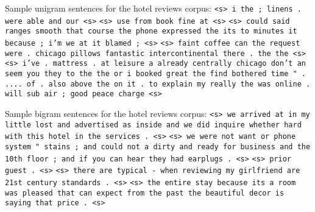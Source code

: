 \documentclass{article}
\begin{document}
Sample unigram sentences for the hotel reviews corpus:\npar
\texttt{<s> i the ; linens . were able and our <s>}\npar
\texttt{<s> use from book fine at <s>}\npar
\texttt{<s> could said ranges smooth that course the phone expressed the its to minutes it because ; i'm we at it blamed ; <s>}\npar
\texttt{<s> faint coffee can the request were . chicago pillows fantastic intercontinental there . the the <s>}\npar
\texttt{<s> i've . mattress . at leisure a already centrally chicago don't an seem you they to the the or i booked great the find bothered time " . .... of . also above the on it . to explain my really the was online . will sub air ; good peace charge <s>}\npar
\bigskip

Sample bigram sentences for the hotel reviews corpus:\npar
\texttt{<s> we arrived at in my little lost and advertised as inside and we did inquire whether hard with this hotel in the services . <s>}\npar
\texttt{<s> we were not want or phone system " stains ; and could not a dirty and ready for business and the 10th floor ; and if you can hear they had earplugs . <s>}\npar
\texttt{<s> prior guest . <s>}\npar
\texttt{<s> there are typical - when reviewing my girlfriend are 21st century standards . <s>}\npar
\texttt{<s> the entire stay because its a room was pleased that can expect from the past the beautiful decor is saying that price . <s>}\npar
\end{document}
